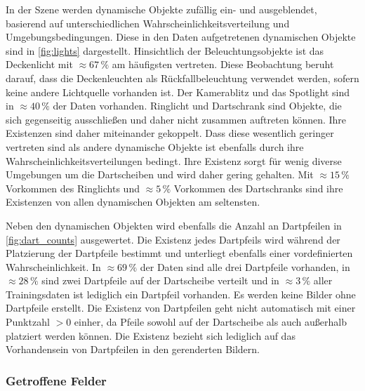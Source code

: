 In der Szene werden dynamische Objekte zufällig ein- und ausgeblendet, basierend auf unterschiedlichen Wahrscheinlichkeitsverteilung und Umgebungsbedingungen. Diese in den Daten aufgetretenen dynamischen Objekte sind in \autoref{fig:lights} dargestellt. Hinsichtlich der Beleuchtungsobjekte ist das Deckenlicht mit $\approx67\,\%$ am häufigsten vertreten. Diese Beobachtung beruht darauf, dass die Deckenleuchten als Rückfallbeleuchtung verwendet werden, sofern keine andere Lichtquelle vorhanden ist. Der Kamerablitz und das Spotlight sind in $\approx40\,\%$ der Daten vorhanden. Ringlicht und Dartschrank sind Objekte, die sich gegenseitig ausschließen und daher nicht zusammen auftreten können. Ihre Existenzen sind daher miteinander gekoppelt. Dass diese wesentlich geringer vertreten sind als andere dynamische Objekte ist ebenfalls durch ihre Wahrscheinlichkeitsverteilungen bedingt. Ihre Existenz sorgt für wenig diverse Umgebungen um die Dartscheiben und wird daher gering gehalten. Mit $\approx15\,\%$ Vorkommen des Ringlichts und $\approx5\,\%$ Vorkommen des Dartschranks sind ihre Existenzen von allen dynamischen Objekten am seltensten.

Neben den dynamischen Objekten wird ebenfalls die Anzahl an Dartpfeilen in \autoref{fig:dart_counts} ausgewertet. Die Existenz jedes Dartpfeils wird während der Platzierung der Dartpfeile bestimmt und unterliegt ebenfalls einer vordefinierten Wahrscheinlichkeit. In $\approx69\,\%$ der Daten sind alle drei Dartpfeile vorhanden, in $\approx28\,\%$ sind zwei Dartpfeile auf der Dartscheibe verteilt und in $\approx3\,\%$ aller Trainingsdaten ist lediglich ein Dartpfeil vorhanden. Es werden keine Bilder ohne Dartpfeile erstellt. Die Existenz von Dartpfeilen geht nicht automatisch mit einer Punktzahl $>0$ einher, da Pfeile sowohl auf der Dartscheibe als auch außerhalb platziert werden können. Die Existenz bezieht sich lediglich auf das Vorhandensein von Dartpfeilen in den gerenderten Bildern.

\subsubsection{Getroffene Felder}
\label{sec:felder_ergebnisse}

